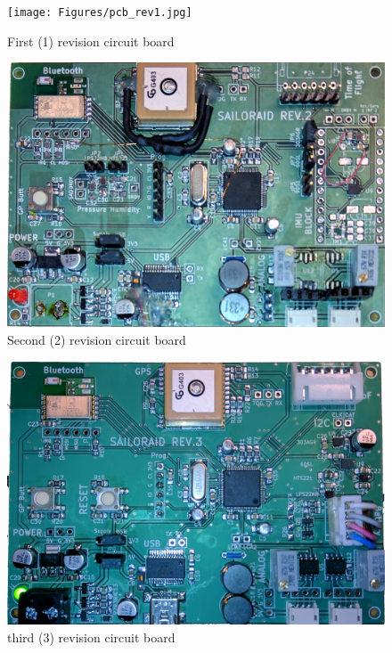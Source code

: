 \begin{figure}[tbh]
	\centering
    \texttt{[image: Figures/pcb\_rev1.jpg]}
	\caption{First (1) revision circuit board}
	\label{fig:pcbr1}
\end{figure}
\begin{figure}[tbh]
	\centering
    \includegraphics[width=\linewidth]{Figures/pcb_rev2.jpg}
	\caption{Second (2) revision circuit board}
	\label{fig:pcbr2}
\end{figure}
\begin{figure}[tbh]
	\centering
    \includegraphics[width=\linewidth]{Figures/pcb_rev3.jpg}
	\caption{third (3) revision circuit board}
	\label{fig:pcbr3}
\end{figure}



